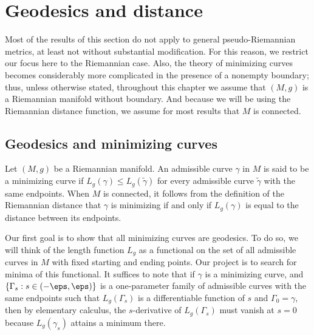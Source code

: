 \section{Geodesics and distance}
Most of the results of this section do not apply to general pseudo-Riemannian metrics, at least not without substantial modification. For this reason, we restrict our focus here to the Riemannian case. Also, the theory of minimizing curves becomes considerably more complicated in the presence of a nonempty boundary; thus, unless otherwise stated, throughout this chapter we assume that $(M,g)$ is a Riemannian manifold without boundary. And because we will be using the Riemannian distance function, we assume for most results that $M$ is connected.
\subsection{Geodesics and minimizing curves}
Let $(M,g)$ be a Riemannian manifold. An admissible curve $\gamma$ in $M$ is said to be a minimizing curve if $L_g(\gamma)\leq L_g(\tilde{\gamma})$ for every admissible curve $\tilde{\gamma}$ with the same endpoints. When $M$ is connected, it follows from the definition of the Riemannian distance that $\gamma$ is minimizing if and only if $L_g(\gamma)$ is equal to the distance between its endpoints.\par
Our first goal is to show that all minimizing curves are geodesics. To do so, we will think of the length function $L_g$ as a functional on the set of all admissible curves in $M$ with fixed starting and ending points. Our project is to search for minima of this functional. It suffices to note that if $\gamma$ is a minimizing curve, and $\{\Gamma_s:s\in(-\eps,\eps)\}$ is a one-parameter family of admissible curves with the same endpoints such that $L_g(\Gamma_s)$ is a differentiable function of $s$ and $\Gamma_0=\gamma$, then by elementary calculus, the $s$-derivative of $L_g(\Gamma_s)$ must vanish at $s=0$ because $L_g(\gamma_s)$ attains a minimum there.
